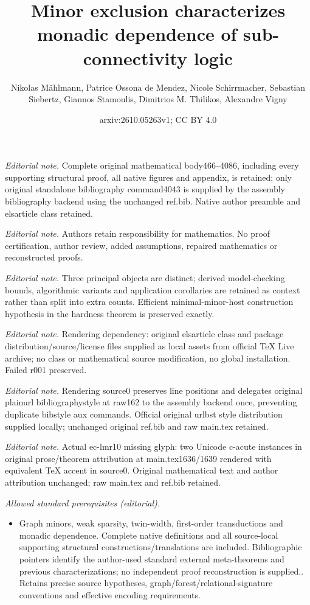 \documentclass[1p,number,11pt]{elsarticle}
\title{Minor exclusion characterizes monadic dependence of sub-connectivity logic}
\author{Nikolas Mählmann, Patrice Ossona de Mendez, Nicole Schirrmacher, Sebastian Siebertz, Giannos Stamoulis, Dimitrios M. Thilikos, Alexandre Vigny}
\date{arxiv:2610.05263v1; CC BY 4.0}
\theoremstyle{plain}
\begin{document}
\maketitle
\noindent\textit{Editorial note.} Complete original mathematical body466--4086, including every supporting structural proof, all native figures and appendix, is retained; only original standalone bibliography command4043 is supplied by the assembly bibliography backend using the unchanged ref.bib. Native author preamble and elsarticle class retained.\par\medskip
\noindent\textit{Editorial note.} Authors retain responsibility for mathematics. No proof certification, author review, added assumptions, repaired mathematics or reconstructed proofs.\par\medskip
\noindent\textit{Editorial note.} Three principal objects are distinct; derived model-checking bounds, algorithmic variants and application corollaries are retained as context rather than split into extra counts. Efficient minimal-minor-host construction hypothesis in the hardness theorem is preserved exactly.\par\medskip
\noindent\textit{Editorial note.} Rendering dependency: original elsarticle class and package distribution/source/license files supplied as local assets from official TeX Live archive; no class or mathematical source modification, no global installation. Failed r001 preserved.\par\medskip
\noindent\textit{Editorial note.} Rendering source0 preserves line positions and delegates original plainurl bibliographystyle at raw162 to the assembly backend once, preventing duplicate bibstyle aux commands. Official original urlbst style distribution supplied locally; unchanged original ref.bib and raw main.tex retained.\par\medskip
\noindent\textit{Editorial note.} Actual ec-lmr10 missing glyph: two Unicode c-acute instances in original prose/theorem attribution at main.tex1636/1639 rendered with equivalent TeX accent in source0. Original mathematical text and author attribution unchanged; raw main.tex and ref.bib retained.\par\medskip
\noindent\textit{Allowed standard prerequisites (editorial).}\begin{itemize}
\item Graph minors, weak sparsity, twin-width, first-order transductions and monadic dependence. Complete native definitions and all source-local supporting structural constructions/translations are included. Bibliographic pointers identify the author-used standard external meta-theorems and previous characterizations; no independent proof reconstruction is supplied.. Retains precise source hypotheses, graph/forest/relational-signature conventions and effective encoding requirements.
\end{itemize}\medskip
\end{document}

